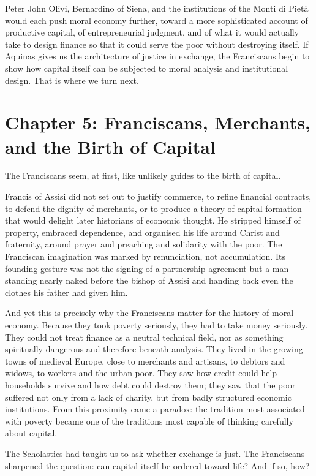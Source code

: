 \documentclass[11pt,a4paper,oneside]{book}
\begin{document}
Peter John Olivi, Bernardino of Siena, and the institutions of the Monti di Pietà would each push moral economy further, toward a more sophisticated account of productive capital, of entrepreneurial judgment, and of what it would actually take to design finance so that it could serve the poor without destroying itself. If Aquinas gives us the architecture of justice in exchange, the Franciscans begin to show how capital itself can be subjected to moral analysis and institutional design. That is where we turn next.

\chapter*{Chapter 5: Franciscans, Merchants, and the Birth of Capital}

The Franciscans seem, at first, like unlikely guides to the birth of capital.

Francis of Assisi did not set out to justify commerce, to refine financial contracts, to defend the dignity of merchants, or to produce a theory of capital formation that would delight later historians of economic thought. He stripped himself of property, embraced dependence, and organised his life around Christ and fraternity, around prayer and preaching and solidarity with the poor. The Franciscan imagination was marked by renunciation, not accumulation. Its founding gesture was not the signing of a partnership agreement but a man standing nearly naked before the bishop of Assisi and handing back even the clothes his father had given him.

And yet this is precisely why the Franciscans matter for the history of moral economy. Because they took poverty seriously, they had to take money seriously. They could not treat finance as a neutral technical field, nor as something spiritually dangerous and therefore beneath analysis. They lived in the growing towns of medieval Europe, close to merchants and artisans, to debtors and widows, to workers and the urban poor. They saw how credit could help households survive and how debt could destroy them; they saw that the poor suffered not only from a lack of charity, but from badly structured economic institutions. From this proximity came a paradox: the tradition most associated with poverty became one of the traditions most capable of thinking carefully about capital.

The Scholastics had taught us to ask whether exchange is just. The Franciscans sharpened the question: can capital itself be ordered toward life? And if so, how?
\end{document}
